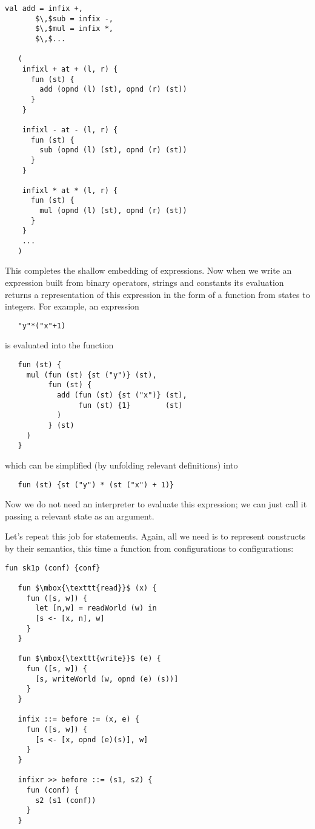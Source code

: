 \begin{lstlisting}[mathescape=true]
   val add = infix +,
       $\,$sub = infix -,
       $\,$mul = infix *,
       $\,$...       
  
   (
    infixl + at + (l, r) {
      fun (st) {
        add (opnd (l) (st), opnd (r) (st))
      }
    }
    
    infixl - at - (l, r) {
      fun (st) {
        sub (opnd (l) (st), opnd (r) (st))
      }
    }
    
    infixl * at * (l, r) {
      fun (st) {
        mul (opnd (l) (st), opnd (r) (st))
      }
    }
    ...
   )
\end{lstlisting}

This completes the shallow embedding of expressions. Now when we write an expression built from binary operators, strings and
constants its evaluation returns a representation of this expression in the form of a function from states to integers. For
example, an expression

\begin{lstlisting}
   "y"*("x"+1)
\end{lstlisting}

is evaluated into the function

\begin{lstlisting}
   fun (st) {
     mul (fun (st) {st ("y")} (st),
          fun (st) {
            add (fun (st) {st ("x")} (st),
                 fun (st) {1}        (st)
            )
          } (st)
     )
   }
\end{lstlisting}

which can be simplified (by unfolding relevant definitions) into

\begin{lstlisting}
   fun (st) {st ("y") * (st ("x") + 1)}
\end{lstlisting}

Now we do not need an interpreter to evaluate this expression; we can just call it passing a relevant state as an argument.

Let's repeat this job for statements. Again, all we need is to represent constructs by their semantics, this time
a function from configurations to configurations:

\begin{lstlisting}[mathescape=true]
   fun sk1p (conf) {conf}
  
   fun $\mbox{\texttt{read}}$ (x) {
     fun ([s, w]) {
       let [n,w] = readWorld (w) in
       [s <- [x, n], w]       
     }
   }

   fun $\mbox{\texttt{write}}$ (e) {
     fun ([s, w]) {
       [s, writeWorld (w, opnd (e) (s))]
     }
   }

   infix ::= before := (x, e) {
     fun ([s, w]) {
       [s <- [x, opnd (e)(s)], w]
     }
   }

   infixr >> before ::= (s1, s2) {
     fun (conf) {
       s2 (s1 (conf))
     }
   }  
\end{lstlisting}

